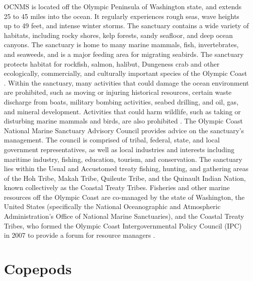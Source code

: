 \documentclass[12pt,twoside]{reedthesis}
\begin{document}
{OCNMS is located off the Olympic Peninsula of Washington state, and extends 25 to 45 miles into the ocean. It regularly experiences rough seas, wave heights up to 49 feet, and intense winter storms. The sanctuary contains a wide variety of habitats, including rocky shores, kelp forests, sandy seafloor, and deep ocean canyons. The sanctuary is home to many marine mammals, fish, invertebrates, and seaweeds, and is a major feeding area for migrating seabirds. The sanctuary protects habitat for rockfish, salmon, halibut, Dungeness crab and other ecologically, commercially, and culturally important species of the Olympic Coast \autocite{OfficeofNationalMarineSanctuaries2022}.  Within the sanctuary, many activities that could damage the ocean environment are prohibited, such as moving or injuring historical resources, certain waste discharge from boats, military bombing activities, seabed drilling, and oil, gas, and mineral development. Activities that could harm wildlife, such as taking or disturbing marine mammals and birds, are also prohibited \autocite{15CFRPart1995}. The Olympic Coast National Marine Sanctuary Advisory Council provides advice on the sanctuary's management. The council is comprised of tribal, federal, state, and local government representatives, as well as local industries and interests including maritime industry, fishing, education, tourism, and conservation. The sanctuary lies within the Usual and Accustomed treaty fishing, hunting, and gathering areas of the Hoh Tribe, Makah Tribe, Quileute Tribe, and the Quinault Indian Nation, known collectively as the Coastal Treaty Tribes. Fisheries and other marine resources off the Olympic Coast are co-managed by the state of Washington, the United States (specifically the National Oceanographic and Atmospheric Administration's Office of National Marine Sanctuaries), and the Coastal Treaty Tribes, who formed the Olympic Coast Intergovernmental Policy Council (IPC) in 2007 to provide a forum for resource managers \autocite{IntergovernmentalPolicyCouncil}.


\section{Copepods}

}
\end{document}
